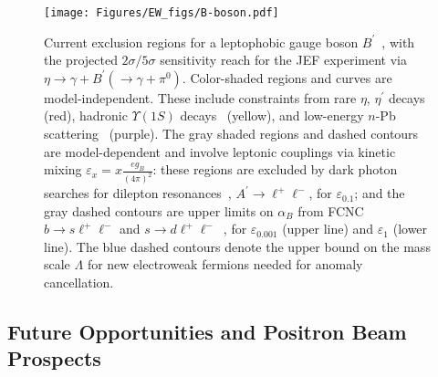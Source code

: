 \begin{figure}[!htb]
\begin{center}
  \texttt{[image: Figures/EW\_figs/B-boson.pdf]}
  \caption{Current exclusion regions for a leptophobic gauge boson
    $B^{\prime}$~\cite{Gan:2020aco, Tulin:2014}, with the projected
    $2\sigma/5\sigma$ sensitivity reach for the JEF experiment via $\eta
    \to \gamma + B^\prime (\to \gamma + \pi^0)$. Color-shaded regions
    and curves are model-independent. These include constraints from
    rare $\eta$, $\eta^\prime$ decays (red), hadronic $\Upsilon (1S)$
    decays~\cite{Aranda:1998fr} (yellow), and low-energy $n$-Pb
    scattering~\cite{Barbieri:1975xy} (purple). The gray shaded regions
    and dashed contours are model-dependent and involve leptonic
    couplings via kinetic mixing $\varepsilon_x = x \frac{e g_B}{(4\pi
      )^2}$: these regions are excluded by dark photon searches for dilepton
    resonances~\cite{Babusci:2012cr,Konaka:1986cb,Riordan:1987aw,Bjorken:1988as,
     Bross:1989mp,Davier:1989wz,Banerjee:2019hmi,Tsai:2019mtm,Astier:2001ck,
     Bernardi:1985ny,Batley:2015lha,LHCb:2019vmc},
    $A^\prime \to \ell^+ \ell^-$, for $\varepsilon_{0.1}$; and the gray
    dashed contours are upper limits on $\alpha_B$ from FCNC $b \to s
    \ell^+ \ell^-$ and $s \to d
    \ell^+\ell^-$~\cite{Dror:2017nsg,Dror:2017ehi}, for
    $\varepsilon_{0.001}$ (upper line) and $\varepsilon_1$ (lower
    line). The blue dashed contours denote the upper bound on the mass
    scale $\Lambda$ for new electroweak fermions needed for anomaly cancellation.}
  \label{b-reach-map}
\end{center}
\end{figure}

\subsection{Future Opportunities and Positron Beam Prospects}


